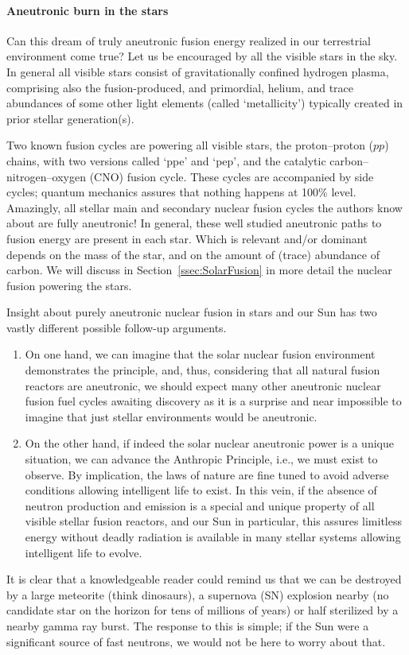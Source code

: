 \documentclass[particles,article,accept,pdftex,moreauthors]{Definitions/mdpi}
\newcommand{\rsec}[1]{Section~\ref{#1}}
\begin{document}
\paragraph*{\bf Aneutronic burn in the stars}
Can this dream of truly aneutronic fusion energy realized in our terrestrial environment come true? Let us be encouraged by all the visible stars in the sky. In general all visible stars consist of gravitationally confined hydrogen plasma, comprising also the fusion-produced, and primordial, helium, and trace abundances of some other light elements (called `metallicity') typically created in prior stellar generation(s). 

Two known fusion cycles are powering all visible stars, the proton--proton ($pp$) chains, with two versions called `ppe' and `pep', and the catalytic carbon--nitrogen--oxygen (CNO) fusion cycle. These cycles are accompanied by side cycles; quantum mechanics assures that nothing happens at 100\% level. Amazingly, all stellar main and secondary nuclear fusion cycles the authors know about are fully aneutronic! In general, these well studied aneutronic paths to fusion energy are present in each star. Which is relevant and/or dominant depends on the mass of the star, and on the amount of (trace) abundance of carbon. We will discuss in \rsec{ssec:SolarFusion} in more detail the nuclear fusion powering the stars.

Insight about purely aneutronic nuclear fusion in stars and our Sun has two vastly different possible follow-up arguments.
\begin{enumerate}
\item On one hand, we can imagine that the solar nuclear fusion environment demonstrates the principle, and, thus, considering that all natural fusion reactors are aneutronic, we should expect many other aneutronic nuclear fusion fuel cycles awaiting discovery as it is a surprise and near impossible to imagine that just stellar environments would be aneutronic.
\item On the other hand, if indeed the solar nuclear aneutronic power is a unique situation, we can advance the Anthropic Principle, i.e., we must exist to observe. By implication, the laws of nature are fine tuned to avoid adverse conditions allowing intelligent life to exist. In this vein, if the absence of neutron production and emission is a special and unique property of all visible stellar fusion reactors, and our Sun in particular, this assures limitless energy without deadly radiation is available in many stellar systems allowing intelligent life to evolve.
\end{enumerate}
It is clear that a knowledgeable reader could remind us that we can be destroyed by a large meteorite (think dinosaurs), a supernova (SN) explosion nearby (no candidate star on the horizon for tens of millions of years) or half sterilized by a nearby gamma ray burst. The response to this is simple; if the Sun were a significant source of fast neutrons, we would not be here to worry about that.
\end{document}

